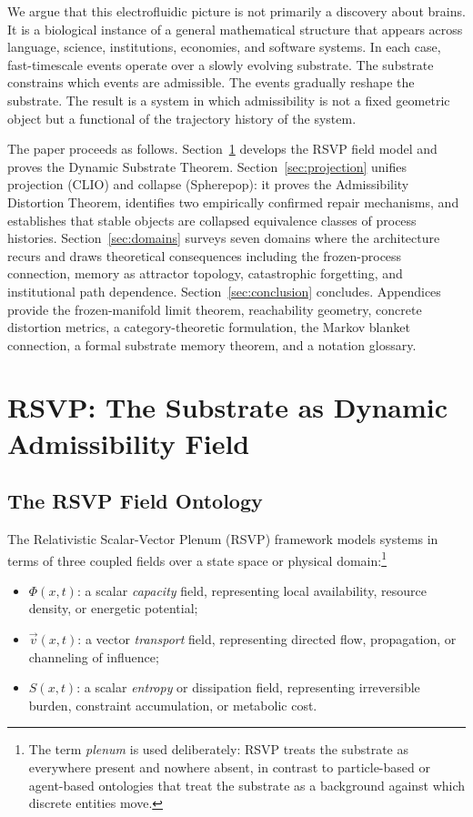 \documentclass[12pt,a4paper]{article}
\begin{document}
We argue that this electrofluidic picture is not primarily a discovery about brains. It is a biological instance of a general mathematical structure that appears across language, science, institutions, economies, and software systems. In each case, fast-timescale events operate over a slowly evolving substrate. The substrate constrains which events are admissible. The events gradually reshape the substrate. The result is a system in which admissibility is not a fixed geometric object but a functional of the trajectory history of the system.

The paper proceeds as follows. Section~\ref{sec:rsvp} develops the RSVP field model and proves the Dynamic Substrate Theorem. Section~\ref{sec:projection} unifies projection (CLIO) and collapse (Spherepop): it proves the Admissibility Distortion Theorem, identifies two empirically confirmed repair mechanisms, and establishes that stable objects are collapsed equivalence classes of process histories. Section~\ref{sec:domains} surveys seven domains where the architecture recurs and draws theoretical consequences including the frozen-process connection, memory as attractor topology, catastrophic forgetting, and institutional path dependence. Section~\ref{sec:conclusion} concludes. Appendices provide the frozen-manifold limit theorem, reachability geometry, concrete distortion metrics, a category-theoretic formulation, the Markov blanket connection, a formal substrate memory theorem, and a notation glossary.

\section{RSVP: The Substrate as Dynamic Admissibility Field}
\label{sec:rsvp}

\subsection{The RSVP Field Ontology}

The Relativistic Scalar-Vector Plenum (RSVP) framework models systems in terms of three coupled fields over a state space or physical domain:\footnote{The term \emph{plenum} is used deliberately: RSVP treats the substrate as everywhere present and nowhere absent, in contrast to particle-based or agent-based ontologies that treat the substrate as a background against which discrete entities move.}
\begin{itemize}
  \item $\Phi(x,t)$: a scalar \emph{capacity} field, representing local availability, resource density, or energetic potential;
  \item $\vec{v}(x,t)$: a vector \emph{transport} field, representing directed flow, propagation, or channeling of influence;
  \item $S(x,t)$: a scalar \emph{entropy} or dissipation field, representing irreversible burden, constraint accumulation, or metabolic cost.
\end{itemize}
\end{document}

